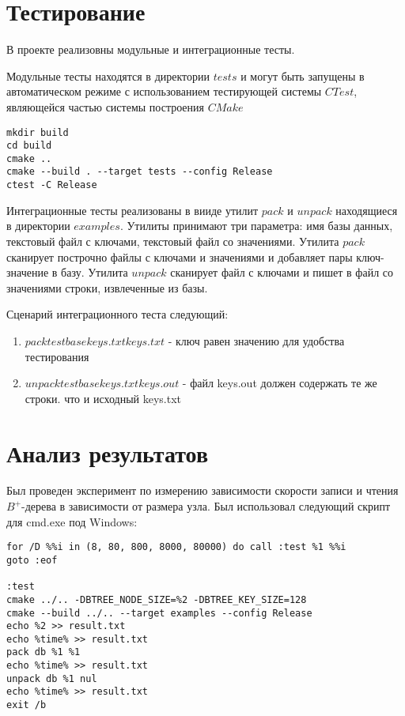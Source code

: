 \documentclass[14pt, russian]{scrartcl}
\begin{document}
\section{Тестирование}
В проекте реализовны модульные и интеграционные тесты. 

Модульные тесты находятся в директории $tests$ и могут быть запущены в автоматическом режиме с использованием тестирующей системы $CTest$, являющейся частью системы построения $CMake$

\begin{verbatim}
mkdir build
cd build
cmake ..
cmake --build . --target tests --config Release
ctest -C Release
\end{verbatim}

Интеграционные тесты реализованы в вииде утилит $pack$ и $unpack$ находящиеся в директории $examples$. Утилиты принимают три параметра: имя базы данных, текстовый файл с ключами, текстовый файл со значениями. Утилита $pack$ сканирует построчно файлы с ключами и значениями и добавляет пары ключ-значение в базу. Утилита $unpack$ сканирует файл с ключами и пишет в файл со значениями строки, извлеченные из базы.

Сценарий интеграционного теста следующий:

\begin{enumerate}
    \item $pack testbase keys.txt keys.txt$  - ключ равен значению для удобства тестирования
    \item $unpack testbase keys.txt keys.out$  - файл keys.out должен содержать те же строки. что и исходный keys.txt    
\end{enumerate}

\section{Анализ результатов}
Был проведен эксперимент по измерению зависимости скорости записи и чтения $B^+$-дерева в зависимости от размера узла. Был использовал следующий скрипт для cmd.exe под Windows:

\begin{verbatim}
for /D %%i in (8, 80, 800, 8000, 80000) do call :test %1 %%i
goto :eof

:test
cmake ../.. -DBTREE_NODE_SIZE=%2 -DBTREE_KEY_SIZE=128
cmake --build ../.. --target examples --config Release
echo %2 >> result.txt
echo %time% >> result.txt
pack db %1 %1
echo %time% >> result.txt
unpack db %1 nul
echo %time% >> result.txt
exit /b
\end{verbatim}
\end{document}
